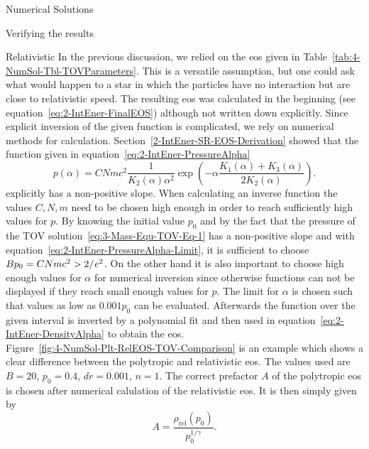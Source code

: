 \begin{section}{Numerical Solutions}
\begin{subsection}{Verifying the results}
% 
\end{subsection}
%
%
\begin{subsection}{Relativistic \texorpdfstring{}{EoS}}
\label{subsec:4-NumSol-Sec-RelEOS}
In the previous discussion, we relied on the \ac{eos} given in Table~\ref{tab:4-NumSol-Tbl-TOVParameters}.
This is a versatile assumption, but one could ask what would happen to a star in which the particles have no interaction but are close to relativistic speed.
The resulting \ac{eos} was calculated in the beginning (see equation~\eqref{eq:2-IntEner-FinalEOS}) although not written down explicitly.
Since explicit inversion of the given function is complicated, we rely on numerical methods for calculation.
Section~\ref{2-IntEner-SR-EOS-Derivation} showed that the function given in equation~\eqref{eq:2-IntEner-PressureAlpha}
\begin{equation}
	p(\alpha) = CNmc^2\frac{1}{K_2(\alpha)\alpha^2}\exp\left(-\alpha\frac{K_1(\alpha)+K_3(\alpha)}{2K_2(\alpha)}\right).
	\label{eq:4-NumSol-Pressure-Alpha-Dep}
\end{equation}
explicitly has a non-positive slope. 
When calculating an inverse function the values $C,N,m$ need to be chosen high enough in order to reach sufficiently high values for $p$.
By knowing the initial value $p_0$ and by the fact that the pressure of the \ac{TOV} solution~\eqref{eq:3-Mass-Equ-TOV-Eq-1} has a non-positive slope and with equation~\eqref{eq:2-IntEner-PressureAlpha-Limit}, it is sufficient to choose $Bp_0=CNmc^2>2/\mathit{e}^2$.
On the other hand it is also important to choose high enough values for $\alpha$ for numerical inversion since otherwise functions can not be displayed if they reach small enough values for $p$.
The limit for $\alpha$ is chosen such that values as low as $0.001p_0$ can be evaluated.
Afterwards the function over the given interval is inverted by a polynomial fit and then used in equation~\eqref{eq:2-IntEner-DensityAlpha} to obtain the \ac{eos}.\\
Figure~\ref{fig:4-NumSol-Plt-RelEOS-TOV-Comparison} is an example which shows a clear difference between the polytropic and relativistic \ac{eos}.
The values used are $B=20$, $p_0=0.4$, $dr=0.001$, $n=1$.
The correct prefactor $A$ of the polytropic \ac{eos} is chosen after numerical calulation of the relativistic \ac{eos}.
It is then simply given by 
\begin{equation}
	A=\frac{\rho_\mathrm{rel}(p_0)}{p_0^{1/\gamma}}.
	\label{eq:4-NumSol-EOS-Factor-Explanation}

\end{equation}
\end{subsection}
\end{section}
